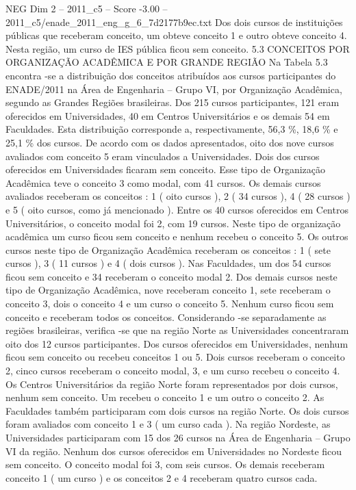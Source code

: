 \begin{textsample}{NEG Dim 2 – 2011\_c5 – Score -3.00 – 2011\_c5/enade\_2011\_eng\_g\_6\_7d2177b9ec.txt}
Dos dois cursos de instituições públicas que receberam conceito, um obteve conceito 1 e outro obteve conceito 4.
Nesta região, um curso de IES pública ficou sem conceito. 5.3 CONCEITOS POR ORGANIZAÇÃO ACADÊMICA E POR GRANDE REGIÃO Na Tabela 5.3 encontra -se a distribuição dos conceitos atribuídos aos cursos participantes do ENADE/2011 na Área de Engenharia – Grupo VI, por Organização Acadêmica, segundo as Grandes Regiões brasileiras.
Dos 215 cursos participantes, 121 eram oferecidos em Universidades, 40 em Centros Universitários e os demais 54 em Faculdades.
Esta distribuição corresponde a, respectivamente, 56,3 \%, 18,6 \% e 25,1 \% dos cursos.
De acordo com os dados apresentados, oito dos nove cursos avaliados com conceito 5 eram vinculados a Universidades.
Dois dos cursos oferecidos em Universidades ficaram sem conceito.
Esse tipo de Organização Acadêmica teve o conceito 3 como modal, com 41 cursos.
Os demais cursos avaliados receberam os conceitos : 1 ( oito cursos ), 2 ( 34 cursos ), 4 ( 28 cursos ) e 5 ( oito cursos, como já mencionado ).
Entre os 40 cursos oferecidos em Centros Universitários, o conceito modal foi 2, com 19 cursos.
Neste tipo de organização acadêmica um curso ficou sem conceito e nenhum recebeu o conceito 5.
Os outros cursos neste tipo de Organização Acadêmica receberam os conceitos : 1 ( sete cursos ), 3 ( 11 cursos ) e 4 ( dois cursos ).
Nas Faculdades, um dos 54 cursos ficou sem conceito e 34 receberam o conceito modal 2.
Dos demais cursos neste tipo de Organização Acadêmica, nove receberam conceito 1, sete receberam o conceito 3, dois o conceito 4 e um curso o conceito 5.
Nenhum curso ficou sem conceito e receberam todos os conceitos.
Considerando -se separadamente as regiões brasileiras, verifica -se que na região Norte as Universidades concentraram oito dos 12 cursos participantes.
Dos cursos oferecidos em Universidades, nenhum ficou sem conceito ou recebeu conceitos 1 ou 5.
Dois cursos receberam o conceito 2, cinco cursos receberam o conceito modal, 3, e um curso recebeu o conceito 4.
Os Centros Universitários da região Norte foram representados por dois cursos, nenhum sem conceito.
Um recebeu o conceito 1 e um outro o conceito 2.
As Faculdades também participaram com dois cursos na região Norte.
Os dois cursos foram avaliados com conceito 1 e 3 ( um curso cada ).
Na região Nordeste, as Universidades participaram com 15 dos 26 cursos na Área de Engenharia – Grupo VI da região.
Nenhum dos cursos oferecidos em Universidades no Nordeste ficou sem conceito.
O conceito modal foi 3, com seis cursos.
Os demais receberam conceito 1 ( um curso ) e os conceitos 2 e 4 receberam quatro cursos cada.

\end{textsample}
